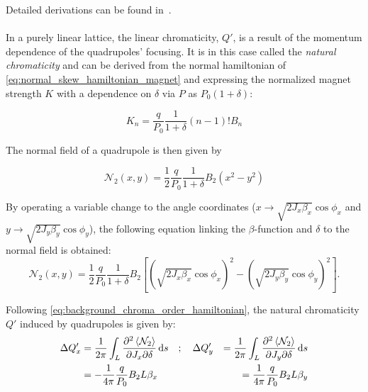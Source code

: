 Detailed derivations can be found in~\cite{dilly_derivation_2023}.

\paragraph{}

In a purely linear lattice, the linear chromaticity, $Q'$, is a result of the momentum dependence 
of the quadrupoles' focusing. It is in this case called the \textit{natural chromaticity} and can be
derived from the normal hamiltonian of \cref{eq:normal_skew_hamiltonian_magnet} and expressing
the normalized magnet strength $K$ with a dependence on $\delta$ via $P$ as $P_0(1+\delta)$:

\begin{equation}
    K_n = \frac{q}{P_0} \frac{1}{1 + \delta} (n - 1)! B_n
    \label{eq:k_dpp}
\end{equation}

The normal field of a quadrupole is then given by

\begin{equation}
    \mathcal{N}_2(x,y) = \frac{1}{2} \frac{q}{P_0} \frac{1}{1+\delta} B_2 (x^2 - y^2)
\end{equation}

By operating a variable change to the angle coordinates 
(\(x \rightarrow \sqrt{2 J_x \beta_x} \cos \phi_x\) and
\(y \rightarrow \sqrt{2 J_y \beta_y} \cos \phi_y\)), the following equation linking the $\beta$-function
and $\delta$ to the normal field is obtained:
\begin{equation}\mathcal{N}_2 (x,y) = \frac{1}{2} \frac{q}{P_0} \frac{1}{1+\delta} B_2 
        \left[
            \left(\sqrt{2 J_x \beta_x} \cos \phi_x \right)^2 
            - \left(\sqrt{2 J_y \beta_y} \cos \phi_y\right)^2
        \right].
    \label{eq:hamiltonian_quadrupole_angle}
\end{equation}

Following \cref{eq:background_chroma_order_hamiltonian}, the natural chromaticity $Q'$ induced by
quadrupoles is given by:
\begin{equation}
    \begin{aligned}
        \Delta Q'_x &= \frac{1}{2\pi} \int_L \frac{\partial^2 \left< \mathcal{N}_2 \right> }{\partial J_x \partial \delta} \mathop{}\!\mathrm{d} s
        \quad;\quad
        \Delta Q'_y &= \frac{1}{2\pi} \int_L \frac{\partial^2 \left< \mathcal{N}_2 \right>}{\partial J_y \partial \delta} \mathop{}\!\mathrm{d} s
        \\
        & = - \frac{1}{4 \pi} \frac{q}{P_0} B_2 L \beta_x
        & = \frac{1}{4 \pi} \frac{q}{P_0} B_2 L \beta_y
    \end{aligned}
\end{equation}


